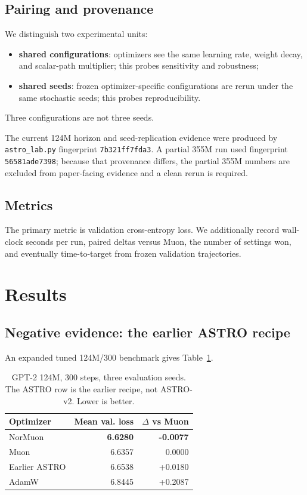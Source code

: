 \documentclass[10pt,twocolumn]{article}
\begin{document}
\subsection{Pairing and provenance}
We distinguish two experimental units:
\begin{itemize}
  \item \textbf{shared configurations}: optimizers see the same learning rate,
  weight decay, and scalar-path multiplier; this probes sensitivity and
  robustness;
  \item \textbf{shared seeds}: frozen optimizer-specific configurations are
  rerun under the same stochastic seeds; this probes reproducibility.
\end{itemize}
Three configurations are not three seeds.

The current 124M horizon and seed-replication evidence were produced by
\texttt{astro\_lab.py} fingerprint \texttt{7b321ff7fda3}. A partial 355M run used
fingerprint \texttt{56581ade7398}; because that provenance differs, the partial
355M numbers are excluded from paper-facing evidence and a clean rerun is
required.

\subsection{Metrics}
The primary metric is validation cross-entropy loss. We additionally record
wall-clock seconds per run, paired deltas versus Muon, the number of settings won,
and eventually time-to-target from frozen validation trajectories.

\section{Results}

\subsection{Negative evidence: the earlier ASTRO recipe}
An expanded tuned 124M/300 benchmark gives Table~\ref{tab:300}.

\begin{table}[t]
\centering
\caption{GPT-2 124M, 300 steps, three evaluation seeds. The ASTRO row is the
earlier recipe, not ASTRO-v2. Lower is better.}
\label{tab:300}
\small
\begin{tabular}{lrr}
\toprule
Optimizer & Mean val. loss & $\Delta$ vs Muon \\
\midrule
NorMuon & \textbf{6.6280} & \textbf{-0.0077} \\
Muon & 6.6357 & 0.0000 \\
Earlier ASTRO & 6.6538 & +0.0180 \\
AdamW & 6.8445 & +0.2087 \\
\bottomrule
\end{tabular}
\end{table}
\end{document}
